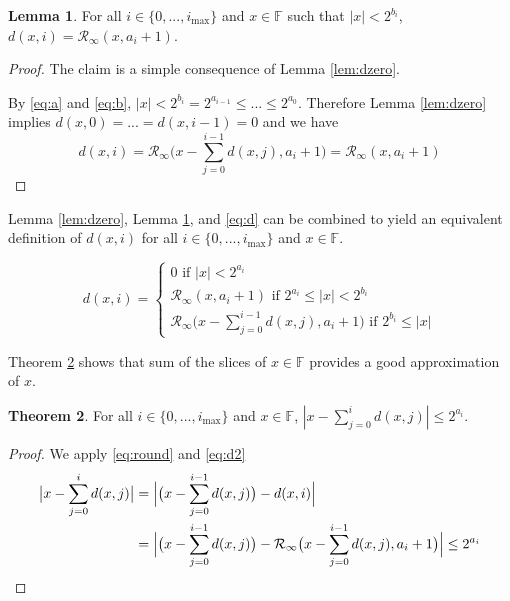 \documentclass[12pt]{article}
\providecommand{\F}{\ensuremath{\mathbb{F}}}
\providecommand{\max}{\ensuremath{\text{max}}}
\providecommand{\roundtonearestinfty}{\ensuremath{\mathcal{R}_\text{$\infty$}}}
\theoremstyle{definition}
\newtheorem{thm}{Theorem}[section]
\newtheorem{lem}[thm]{Lemma}
\numberwithin{equation}{section}
\numberwithin{figure}{section}
\begin{document}
    \begin{samepage}
    \begin{lem}
      For all $i \in \{0, ..., i_{\max}\}$ and $x \in \F$ such that $|x| < 2^{b_i}$, $d(x, i) = \roundtonearestinfty(x, a_i + 1)$.
      \label{lem:dmiddle}
    \end{lem}
    \end{samepage}

    \begin{proof}
      The claim is a simple consequence of Lemma \ref{lem:dzero}.

      By  \eqref{eq:a} and \eqref{eq:b}, $|x| < 2^{b_i} = 2^{a_{i - 1}} \leq  ... \leq 2^{a_0}$. Therefore Lemma \ref{lem:dzero} implies $d(x, 0) = ... = d(x, i - 1) = 0$ and we have \begin{equation*}
        d(x, i) = \roundtonearestinfty\bigl(x - \sum\limits_{j = 0}^{i - 1}d(x, j), a_{i} + 1\bigr) = \roundtonearestinfty(x, a_{i} + 1)
      \end{equation*}
    \end{proof}

    Lemma \ref{lem:dzero}, Lemma \ref{lem:dmiddle}, and \eqref{eq:d} can be combined to yield an equivalent definition of $d(x, i)$ for all $i \in \{0, ..., i_{\max}\}$ and $x \in \F$.

    \begin{equation}
      d(x, i) = \begin{cases}0 \text{ if } |x| < 2^{a_i}\\ \roundtonearestinfty(x, a_i + 1) \text{ if } 2^{a_i} \leq |x| < 2^{b_i}\\\roundtonearestinfty\bigl(x - \sum\limits_{j=0}^{i - 1}d(x,j), a_i + 1\bigr) \text{ if } 2^{b_i} \leq |x| \end{cases}
      \label{eq:d2}
    \end{equation}

    Theorem \ref{thm:dround} shows that sum of the slices of $x \in \F$ provides a good approximation of $x$.

    \begin{samepage}
    \begin{thm}
      For all $i \in \{0, ..., i_{\max}\}$ and $x \in \F$, $|x - \sum \limits_{j = 0}^id(x, j)| \leq 2^{a_i}$.
      \label{thm:dround}
    \end{thm}
    \end{samepage}

    \begin{proof}
      We apply  \eqref{eq:round} and \eqref{eq:d2}
      \begin{align*}
        \bigl|x - \sum \limits_{j = 0}^{i}d(x, j)\bigr| & = \Bigl|\bigl(x - \sum \limits_{j = 0}^{i - 1}d(x, j)\bigr) - d(x, i)\Bigr| \\
         & = \Bigl|\bigl(x - \sum \limits_{j = 0}^{i - 1}d(x, j)\bigr) - \roundtonearestinfty\bigl(x - \sum \limits_{j = 0}^{i - 1}d(x, j), a_{i} + 1\bigr)\Bigr| \leq 2^{a_{i}}
      \end{align*}
    \end{proof}
\end{document}
